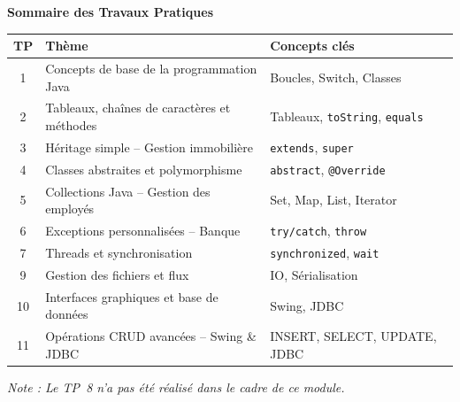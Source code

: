 \documentclass[12pt,a4paper]{report}
\begin{document}
\begin{titlepage}
  \begin{mdframed}[linecolor=grisBorder, linewidth=0.8pt,
    backgroundcolor=white,
    innertopmargin=12pt, innerbottommargin=12pt,
    innerleftmargin=10pt, innerrightmargin=10pt,
    roundcorner=5pt]
    \centering
    {\large\bfseries\color{bleuENSA}Sommaire des Travaux Pratiques}\\[8pt]
    \renewcommand{\arraystretch}{1.25}
    \begin{tabularx}{0.97\linewidth}{@{}c X p{3.8cm}@{}}
      \toprule
      \rowcolor{bleuENSA!12}
      \textbf{TP} & \textbf{Thème} & \textbf{Concepts clés} \\
      \midrule
      1  & Concepts de base de la programmation Java    & Boucles, Switch, Classes \\
      2  & Tableaux, chaînes de caractères et méthodes  & Tableaux, \texttt{toString}, \texttt{equals} \\
      3  & Héritage simple -- Gestion immobilière       & \texttt{extends}, \texttt{super} \\
      4  & Classes abstraites et polymorphisme           & \texttt{abstract}, \texttt{@Override} \\
      5  & Collections Java -- Gestion des employés     & Set, Map, List, Iterator \\
      6  & Exceptions personnalisées -- Banque           & \texttt{try/catch}, \texttt{throw} \\
      7  & Threads et synchronisation                   & \texttt{synchronized}, \texttt{wait} \\
      9  & Gestion des fichiers et flux                 & IO, Sérialisation \\
      10 & Interfaces graphiques et base de données     & Swing, JDBC \\
      11 & Opérations CRUD avancées -- Swing \& JDBC   & INSERT, SELECT, UPDATE, JDBC \\
      \bottomrule
    \end{tabularx}
    \vspace{4pt}
    {\footnotesize\color{grisTexte}\textit{Note : Le TP~8 n'a pas été réalisé dans le cadre de ce module.}}
  \end{mdframed}

\end{titlepage}

\setcounter{tocdepth}{2}
\tableofcontents
\thispagestyle{empty}
\newpage
\end{document}
